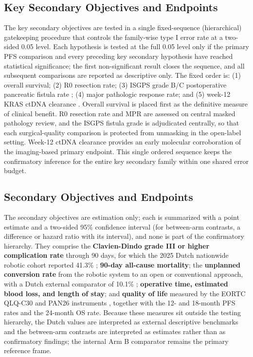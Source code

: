 \subsection{Key Secondary Objectives and Endpoints}

The key secondary objectives are tested in a single fixed-sequence (hierarchical)
gatekeeping procedure that controls the family-wise type I error rate at a
two-sided 0.05 level. Each hypothesis is tested at the full 0.05 level only if the
primary PFS comparison and every preceding key secondary hypothesis have reached
statistical significance; the first non-significant result closes the sequence, and
all subsequent comparisons are reported as descriptive only. The fixed order is:
(1) overall survival; (2) R0 resection rate; (3) ISGPS grade B/C postoperative
pancreatic fistula rate \cite{Bassi2017}; (4) major pathologic response rate; and
(5) week-12 KRAS ctDNA clearance \cite{Tie2019ctdna}. Overall survival is placed
first as the definitive measure of clinical benefit. R0 resection rate and MPR are
assessed on central masked pathology review, and the ISGPS fistula grade is
adjudicated centrally, so that each surgical-quality comparison is protected from
unmasking in the open-label setting. Week-12 ctDNA clearance provides an early
molecular corroboration of the imaging-based primary endpoint. This single ordered
sequence keeps the confirmatory inference for the entire key secondary family
within one shared error budget.

\subsection{Secondary Objectives and Endpoints}

The secondary objectives are estimation only; each is summarized with a point
estimate and a two-sided 95\% confidence interval (for between-arm contrasts, a
difference or hazard ratio with its interval), and none is part of the confirmatory
hierarchy. They comprise the \textbf{Clavien-Dindo grade III or higher
complication rate} through 90 days, for which the 2025 Dutch nationwide robotic
cohort reported 41.3\% \cite{DutchCohort2025}; \textbf{90-day all-cause
mortality}; the \textbf{unplanned conversion rate} from the robotic system to an
open or conventional approach, with a Dutch external comparator of 10.1\%
\cite{DutchCohort2025}; \textbf{operative time, estimated blood loss, and length of
stay}; and \textbf{quality of life} measured by the EORTC QLQ-C30 and PAN26
instruments \cite{EORTCqlqc30}, together with the 12- and 18-month PFS rates and
the 24-month OS rate. Because these measures sit outside the testing hierarchy,
the Dutch values are interpreted as external descriptive benchmarks and the
between-arm contrasts are interpreted as estimates rather than as confirmatory
findings; the internal Arm B comparator remains the primary reference frame.

